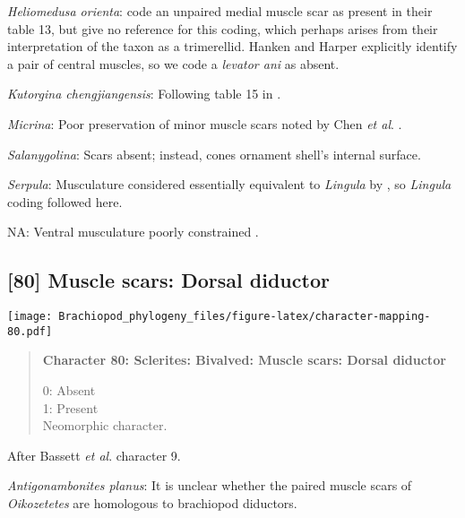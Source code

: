 \documentclass[openany]{book}
\theoremstyle{definition}
\theoremstyle{definition}
\theoremstyle{definition}
\theoremstyle{remark}
\begin{document}
\hypertarget{Heliomedusa_orienta-coding-79}{}
\emph{Heliomedusa orienta}:
\citet{Williams2000LinguliformeaCraniiformea} code an unpaired medial
muscle scar as present in their table 13, but give no reference for this
coding, which perhaps arises from their interpretation of the taxon as a
trimerellid. Hanken and Harper \citeyearpar[p.~249 and text-fig.
2]{Hanken1985Thetaxonomy} explicitly identify a pair of central muscles,
so we code a \emph{levator ani} as absent.

\hypertarget{Kutorgina_chengjiangensis-coding-79}{}
\emph{Kutorgina chengjiangensis}: Following table 15 in
\citet{Williams2000LinguliformeaCraniiformea}.

\hypertarget{Micrina-coding-79}{}
\emph{Micrina}: Poor preservation of minor muscle scars noted by Chen
\emph{et al}. \citeyearpar{Chen2007Reinterpretationof}.

\hypertarget{Salanygolina-coding-79}{}
\emph{Salanygolina}: Scars absent; instead, cones ornament shell's
internal surface.

\hypertarget{Serpula-coding-79}{}
\emph{Serpula}: Musculature considered essentially equivalent to
\emph{Lingula} by \citet{Williams2000LinguliformeaCraniiformea}, so
\emph{Lingula} coding followed here.

\hypertarget{NA-coding-79}{}
NA: Ventral musculature poorly constrained
\citep{Williams2000LinguliformeaCraniiformea, Popov2009Earlyontogeny}.

\subsection*{{[}80{]} Muscle scars: Dorsal
diductor}\label{muscle-scars-dorsal-diductor}

\texttt{[image: Brachiopod\_phylogeny\_files/figure-latex/character-mapping-80.pdf]}

\begin{quote}
\textbf{Character 80: Sclerites: Bivalved: Muscle scars: Dorsal
diductor}

0: Absent\\
1: Present\\
Neomorphic character.
\end{quote}

After Bassett \emph{et al}.
\citeyearpar{Bassett2001Functionalmorphology} character 9.

\hypertarget{Antigonambonites_planus-coding-80}{}
\emph{Antigonambonites planus}: It is unclear whether the paired muscle
scars of \emph{Oikozetetes} are homologous to brachiopod diductors.
\end{document}

